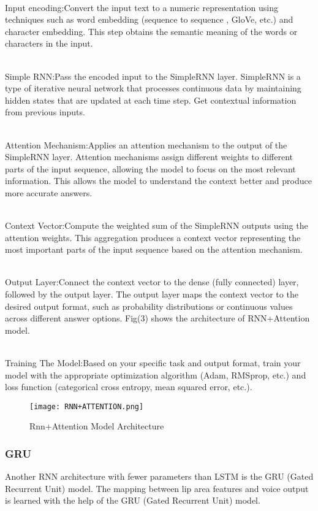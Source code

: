 \documentclass[conference]{IEEEtran}
\begin{document}
\\ Input encoding:Convert the input text to a numeric representation using techniques such as word embedding (sequence to sequence , GloVe, etc.) and character embedding. This step obtains the semantic meaning of the words or characters in the input.

\\ Simple RNN:Pass the encoded input to the SimpleRNN layer. SimpleRNN is a type of iterative neural network that processes continuous data by maintaining hidden states that are updated at each time step. Get contextual information from previous inputs. 

\\ Attention Mechanism:Applies an attention mechanism to the output of the SimpleRNN layer. Attention mechanisms assign different weights to different parts of the input sequence, allowing the model to focus on the most relevant information. This allows the model to understand the context better and produce more accurate answers.

\\ Context Vector:Compute the weighted sum of the SimpleRNN outputs using the attention weights. This aggregation produces a context vector representing the most important parts of the input sequence based on the attention mechanism. 

\\ Output Layer:Connect the context vector to the dense (fully connected) layer, followed by the output layer. The output layer maps the context vector to the desired output format, such as probability distributions or continuous values across different answer options. Fig(3) shows the architecture of RNN+Attention model.

\\ Training The Model:Based on your specific task and output format, train your model with the appropriate optimization algorithm (Adam, RMSprop, etc.) and loss function (categorical cross entropy, mean squared error, etc.). 

\begin{figure}[htbp]
\centerline{\texttt{[image: RNN+ATTENTION.png]}}
\caption{Rnn+Attention Model Architecture}
\label{fig}
\end{figure}

\subsubsection{GRU}
Another RNN architecture with fewer parameters than LSTM is the GRU (Gated Recurrent Unit) model. The mapping between lip area features and voice output is learned with the help of the GRU (Gated Recurrent Unit) model.
\end{document}
